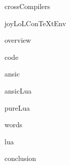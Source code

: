 
\usemodule[t-diSimp]

\startDiSimpComponent crossCompilers

\diSimpEnvironment joyLoLConTeXtEnv

\startJoyLoLCoAlg[title=Cross compilers][crossCompilers]

\diSimpComponent overview

\diSimpComponent code

\diSimpComponent ansic

\diSimpComponent ansicLua

\diSimpComponent pureLua

\diSimpComponent words

\diSimpComponent lua

\diSimpComponent conclusion

\stopJoyLoLCoAlg

\stopDiSimpComponent

